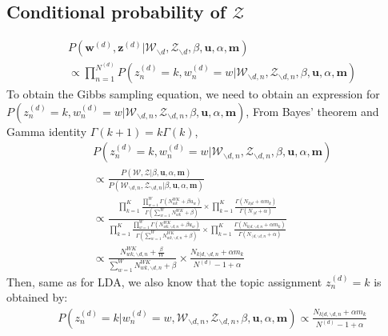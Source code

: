\documentclass[a4paper]{article}
\begin{document}
  \subsection{Conditional probability of $\mathcal{Z}$}
  \begin{equation}
  \begin{aligned}
  & P(\boldsymbol{w}^{(d)}, \boldsymbol{z}^{(d)}|\mathcal{W}_{\backslash d}, \mathcal{Z}_{\backslash d}, \beta, \boldsymbol{u}, \alpha, \boldsymbol{m}) \\& \propto \prod_{n=1}^{N^{(d)}}P(z^{(d)}_n=k, w^{(d)}_n=w| \mathcal{W}_{\backslash d, n}, \mathcal{Z}_{\backslash d, n}, \beta, \boldsymbol{u}, \alpha, \boldsymbol{m})
  \end{aligned}
  \end{equation} 
  To obtain the Gibbs sampling equation, we need to obtain an expression for $P(z^{(d)}_n=k,  w^{(d)}_n=w|\mathcal{W}_{\backslash d, n}, \mathcal{Z}_{\backslash d, n}, \beta, \boldsymbol{u}, \alpha, \boldsymbol{m})$,
  From Bayes' theorem and Gamma identity $\Gamma(k+1)=k\Gamma(k)$,
  \begin{equation}
  \begin{aligned}
  & P(z^{(d)}_n=k, w^{(d)}_n=w|\mathcal{W}_{\backslash d, n}, \mathcal{Z}_{\backslash d, n}, \beta, \boldsymbol{u}, \alpha, \boldsymbol{m}) \\& \propto 
  \frac{P(\mathcal{W}, \mathcal{Z}|\beta, \boldsymbol{u}, \alpha, \boldsymbol{m})}{P(\mathcal{W}_{\backslash d, n}, \mathcal{Z}_{\backslash d, n}|\beta, \boldsymbol{u}, \alpha, \boldsymbol{m})}\\& \propto \frac{\prod_{k=1}^{K}\frac{\prod_{w=1}^W\Gamma(N_{wk}^{WK}+\beta u_w)}{\Gamma(\sum_{w=1}^WN_{wk}^{WK}+\beta )}\times\prod_{k=1}^K\frac{\Gamma(N_{k|d}+\alpha m_k)}{\Gamma(N_{\cdot|d}+\alpha)}}{\prod_{k=1}^{K}\frac{\prod_{w=1}^W\Gamma(N_{wk, \backslash d, n}^{WK}+\beta u_w)}{\Gamma(\sum_{w=1}^WN_{wk, \backslash d, n}^{WK}+\beta )}\times\prod_{k=1}^K\frac{\Gamma(N_{k|d, \backslash d, n}+\alpha m_k)}{\Gamma(N_{\cdot|d, \backslash d, n}+\alpha)}}\\ & \propto 
  \frac{N_{wk, \backslash d, n}^{WK}+\frac{\beta}{W}}{\sum_{w=1}^WN_{wk,  \backslash d, n}^{WK}+\beta}\times\frac{N_{k|d, \backslash d, n}+\alpha m_k}{N^{(d)}-1+\alpha}
  \end{aligned}
  \end{equation}
  Then, same as for LDA, we also know that the topic assignment $z_n^{(d)}=k$ is obtained by:
  \begin{equation}
  \begin{aligned}
  &P(z^{(d)}_n=k|w^{(d)}_n=w, \mathcal{W}_{\backslash d, n}, \mathcal{Z}_{\backslash d,n}, \beta, \boldsymbol{u}, \alpha, \boldsymbol{m}) \propto
  \frac{N_{k|d, \backslash d, n}+\alpha m_k}{N^{(d)}-1+\alpha}
  \end{aligned}
  \end{equation}
\end{document}
